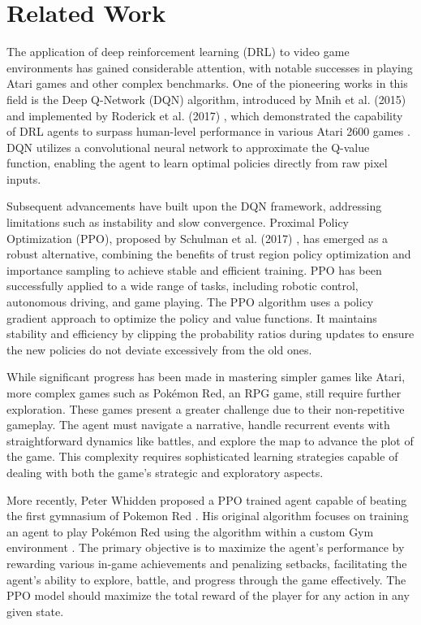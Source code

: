 \documentclass[10pt,conference]{IEEEtran}
\begin{document}
\section{Related Work}
The application of deep reinforcement learning (DRL) to video game environments has gained considerable attention, with notable successes in playing Atari games and other complex benchmarks. One of the pioneering works in this field is the Deep Q-Network (DQN) algorithm, introduced by Mnih et al. (2015) \cite{ref:dqn} and implemented by Roderick et al. (2017) \cite{ref:dqn2}, which demonstrated the capability of DRL agents to surpass human-level performance in various Atari 2600 games \cite{ref:ale}. DQN utilizes a convolutional neural network to approximate the Q-value function, enabling the agent to learn optimal policies directly from raw pixel inputs.

Subsequent advancements have built upon the DQN framework, addressing limitations such as instability and slow convergence. Proximal Policy Optimization (PPO), proposed by Schulman et al. (2017) \cite{ref:ppo}, has emerged as a robust alternative, combining the benefits of trust region policy optimization and importance sampling to achieve stable and efficient training. PPO has been successfully applied to a wide range of tasks, including robotic control, autonomous driving, and game playing. The PPO algorithm uses a policy gradient approach to optimize the policy and value functions. It maintains stability and efficiency by clipping the probability ratios during updates to ensure the new policies do not deviate excessively from the old ones. 

While significant progress has been made in mastering simpler games like Atari, more complex games such as Pokémon Red, an RPG game, still require further exploration. These games present a greater challenge due to their non-repetitive gameplay. The agent must navigate a narrative, handle recurrent events with straightforward dynamics like battles, and explore the map to advance the plot of the game. This complexity requires sophisticated learning strategies capable of dealing with both the game's strategic and exploratory aspects.

More recently, Peter Whidden proposed a PPO trained agent capable of beating the first gymnasium of Pokemon Red \cite{ref:whidden}. His original algorithm focuses on training an agent to play Pokémon Red using the algorithm within a custom Gym environment \cite{ref:gymnasium}. The primary objective is to maximize the agent's performance by rewarding various in-game achievements and penalizing setbacks, facilitating the agent's ability to explore, battle, and progress through the game effectively. The PPO model should maximize the total reward of the player for any action in any given state.
\end{document}
